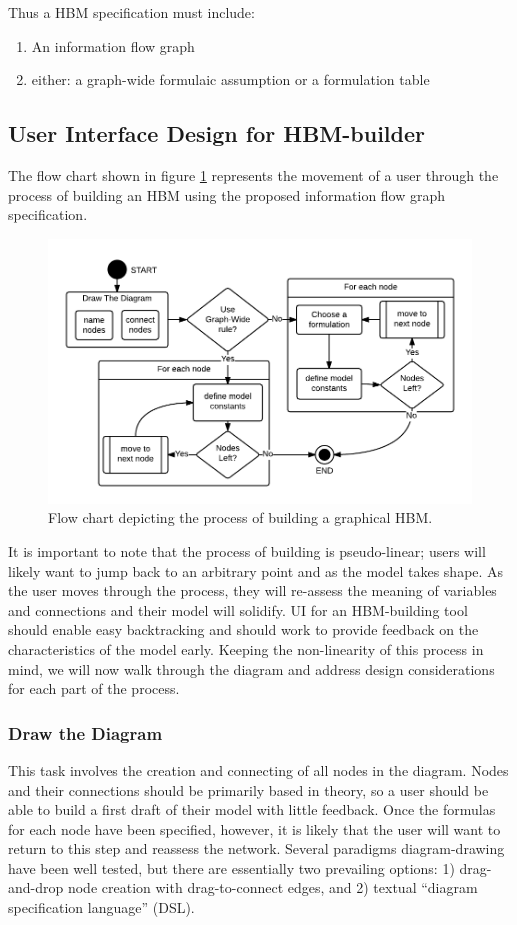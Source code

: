 \documentclass[runningheads,a4paper]{llncs}
\begin{document}
Thus a HBM specification must include:
\begin{enumerate}
  \item An information flow graph
  \item either: a graph-wide formulaic assumption or a formulation table 
\end{enumerate}

\subsection{User Interface Design for HBM-builder }
The flow chart shown in figure \ref{HBM-build-process} represents the movement of a user through the process of building an HBM using the proposed information flow graph specification.

\begin{figure}[!t]
  \centering
  \includegraphics[width=0.9\columnwidth]{img/HBM-build-process}
  \caption{Flow chart depicting the process of building a graphical HBM.}
  \label{HBM-build-process}
\end{figure}

It is important to note that the process of building is pseudo-linear; users will likely want to jump back to an arbitrary point and as the model takes shape. 
As the user moves through the process, they will re-assess the meaning of variables and connections and their model will solidify. 
UI for an HBM-building tool should enable easy backtracking and should work to provide feedback on the characteristics of the model early. 
Keeping the non-linearity of this process in mind, we will now walk through the diagram and address design considerations for each part of the process.

\subsubsection{Draw the Diagram}
This task involves the creation and connecting of all nodes in the diagram. 
Nodes and their connections should be primarily based in theory, so a user should be able to build a first draft of their model with little feedback. 
Once the formulas for each node have been specified, however, it is likely that the user will want to return to this step and reassess the network. 
Several paradigms diagram-drawing have been well tested, but there are essentially two prevailing options:
1) drag-and-drop node creation with drag-to-connect edges, and 2) textual ``diagram specification language'' (DSL).
\end{document}
